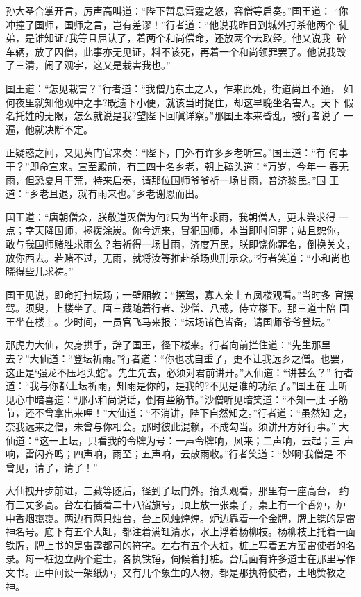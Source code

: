 孙大圣合掌开言，厉声高叫道：“陛下暂息雷霆之怒，容僧等启奏。”国王道：
“你冲撞了国师，国师之言，岂有差谬！”行者道：“他说我昨日到城外打杀他两个
徒弟，是谁知证?我等且屈认了，着两个和尚偿命，还放两个去取经。他又说我
碎车辆，放了囚僧，此事亦无见证，料不该死，再着一个和尚领罪罢了。他说我毁
了三清，闹了观宇，这又是栽害我也。”

国王道：“怎见栽害？”行者道：“我僧乃东土之人，乍来此处，街道尚且不通，
如何夜里就知他观中之事?既遗下小便，就该当时捉住，却这早晚坐名害人。天下
假名托姓的无限，怎么就说是我?望陛下回嗔详察。”那国王本来昏乱，被行者说了
一遍，他就决断不定。

正疑惑之间，又见黄门官来奏：“陛下，门外有许多乡老听宣。”国王道：“有
何事干？”即命宣来。宣至殿前，有三四十名乡老，朝上磕头道：“万岁，今年一
春无雨，但恐夏月干荒，特来启奏，请那位国师爷爷祈一场甘雨，普济黎民。”国
王道：“乡老且退，就有雨来也。”乡老谢恩而出。

国王道：“唐朝僧众，朕敬道灭僧为何?只为当年求雨，我朝僧人，更未尝求得
一点；幸天降国师，拯援涂炭。你今远来，冒犯国师，本当即时问罪；姑且恕你，
敢与我国师赌胜求雨么？若祈得一场甘雨，济度万民，朕即饶你罪名，倒换关文，
放你西去。若赌不过，无雨，就将汝等推赴杀场典刑示众。”行者笑道：“小和尚也
晓得些儿求祷。”

国王见说，即命打扫坛场；一壁厢教：“摆驾，寡人亲上五凤楼观看。”当时多
官摆驾。须臾，上楼坐了。唐三藏随着行者、沙僧、八戒，侍立楼下。那三道士陪
国王坐在楼上。少时间，一员官飞马来报：“坛场诸色皆备，请国师爷爷登坛。”

那虎力大仙，欠身拱手，辞了国王，径下楼来。行者向前拦住道：“先生那里
去？”大仙道：“登坛祈雨。”行者道：“你也忒自重了，更不让我远乡之僧。也罢，
这正是‘强龙不压地头蛇’。先生先去，必须对君前讲开。”大仙道：“讲甚么？”
行者道：“我与你都上坛祈雨，知雨是你的，是我的?不见是谁的功绩了。”国王在
上听见心中暗喜道：“那小和尚说话，倒有些筋节。”沙僧听见暗笑道：“不知一肚
子筋节，还不曾拿出来哩！”大仙道：“不消讲，陛下自然知之。”行者道：“虽然知
之，奈我远来之僧，未曾与你相会。那时彼此混赖，不成勾当。须讲开方好行事。”
大仙道：“这一上坛，只看我的令牌为号：一声令牌响，风来；二声响，云起；三
声响，雷闪齐鸣；四声响，雨至；五声响，云散雨收。”行者笑道：“妙啊!我僧是
不曾见，请了，请了！”

大仙拽开步前进，三藏等随后，径到了坛门外。抬头观看，那里有一座高台，
约有三丈多高。台左右插着二十八宿旗号，顶上放一张桌子，桌上有一个香炉，炉
中香烟霭霭。两边有两只烛台，台上风烛煌煌。炉边靠着一个金牌，牌上镌的是雷
神名号。底下有五个大缸，都注着满缸清水，水上浮着杨柳枝。杨柳枝上托着一面
铁牌，牌上书的是雷霆都司的符字。左右有五个大桩，桩上写着五方蛮雷使者的名
录。每一桩边立两个道士，各执铁锤，伺候着打桩。台后面有许多道士在那里写作
文书。正中间设一架纸炉，又有几个象生的人物，都是那执符使者，土地赞教之神。

